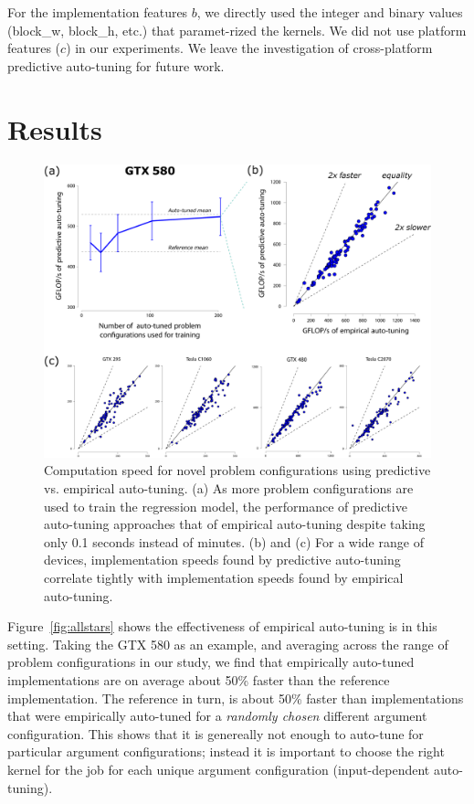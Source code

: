 \documentclass{sig-alternate}
\begin{document}
For the implementation features $b$, we directly used the integer and binary
values (block\_w, block\_h, etc.) that paramet-rized the kernels.  We did not
use platform features ($c$) in our experiments. We leave the investigation of
cross-platform predictive auto-tuning for future work.

\section{Results}

\begin{figure}[!t]
\centering
\includegraphics[width=.9\linewidth]{illustrator/fig_main_R1.pdf}
\caption{
Computation speed for novel problem configurations using predictive
vs. empirical auto-tuning.
(a) As more problem configurations are used to train the regression model,
the performance of predictive auto-tuning approaches that of empirical auto-tuning
despite taking only 0.1 seconds instead of minutes.
(b) and (c) For a wide range of devices, implementation speeds found by predictive auto-tuning correlate tightly with
implementation speeds found by empirical auto-tuning.
}
\label{fig:fig_gflop_scatter}
\end{figure}


Figure~\ref{fig:allstars} shows the effectiveness of empirical auto-tuning is
in this setting.  Taking the GTX 580 as an example, and averaging across the
range of problem configurations in our study, we find that empirically
auto-tuned implementations are on average about 50\% faster than the reference
implementation.  The reference in turn, is about 50\% faster than
implementations that were empirically auto-tuned for a \emph{randomly chosen}
different argument configuration.  This shows that it is genereally not enough
to auto-tune for particular argument configurations; instead it is important to
choose the right kernel for the job for each unique argument configuration
(input-dependent auto-tuning).
\end{document}
